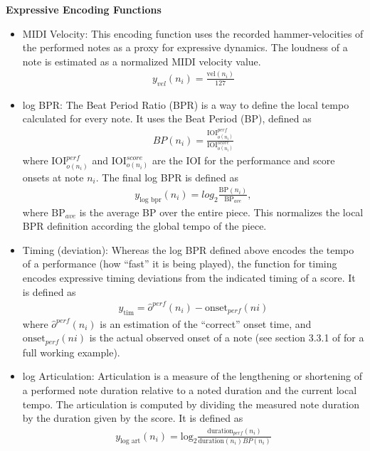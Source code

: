 \textbf{Expressive Encoding Functions}

\newcommand{\iois}{\textrm{IOI}_{o(n_i)}^{score}}
\newcommand{\ioip}{\textrm{IOI}_{o(n_i)}^{perf}}
\begin{itemize}
    \item MIDI Velocity: This encoding function uses the recorded hammer-velocities of the performed notes as a proxy for expressive dynamics. The loudness of a note is estimated as a normalized MIDI velocity value. 
    \begin{align*}
    y_{vel}(n_i) = \frac{\textrm{vel}(n_i)}{127}
    \end{align*}
    \item log BPR: The Beat Period Ratio (BPR) is a way to define the local tempo calculated for every note. It uses the Beat Period (BP), defined as 
        \begin{align*}
        BP(n_i) = \frac{\ioip}{\iois}
        \end{align*}
    where $\ioip$ and $\iois$ are the IOI for the performance and score onsets at note $n_i$. The final log BPR is defined as 
        \begin{align*}
        y_{\textrm{log bpr}}(n_i) = log_2\frac{\textrm{BP}(n_i)}{\textrm{BP}_{ave}},
        \end{align*}
    where $\textrm{BP}_{ave}$ is the average BP over the entire piece. This normalizes the local BPR definition according the global tempo of the piece. 
    \item Timing (deviation): Whereas the log BPR defined above encodes the tempo of a performance (how ``fast'' it is being played), the function for timing encodes expressive timing deviations from the indicated timing of a score. It is defined as 
        \begin{align*}
        y_{\textrm{tim}} = \hat{o}^{perf}(n_i) - \textrm{onset}_{perf}(ni)
        \end{align*}
     where $\hat{o}^{perf}(n_i)$ is an estimation of the ``correct'' onset time, and $\textrm{onset}_{perf}(ni)$ is the actual observed onset of a note (see section 3.3.1 of \citet{eduardo2018computational} for a full working example). 
    \item log Articulation: Articulation is a measure of the lengthening or shortening of a performed note duration relative to a noted duration and the current local tempo. The articulation is computed by dividing the measured note duration by the duration given by the score. It is defined as 
        \begin{align*}
        y_{\textrm{log art}}(n_i) = \textrm{log}_2\frac{\textrm{duration}_{perf}(n_i)}{\textrm{duration}(n_i)BP(n_i)}
        \end{align*}
    
\end{itemize}

